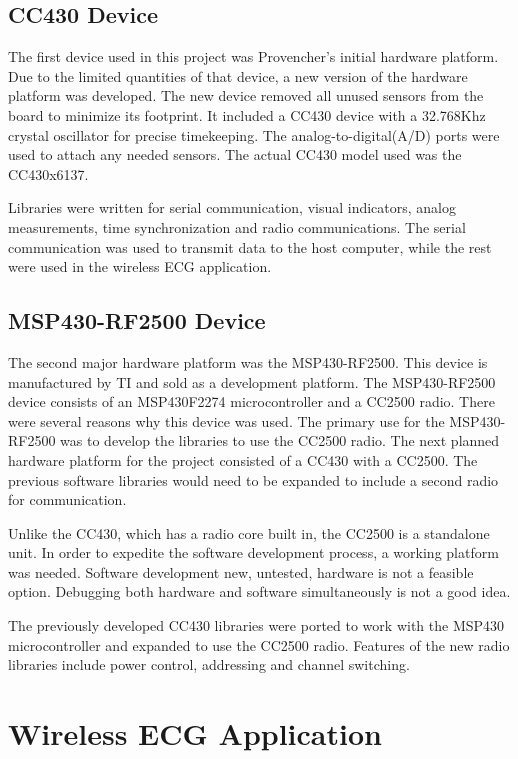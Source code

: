 \documentclass{article}
\begin{document}
\subsection{CC430 Device}
The first device used in this project was Provencher's initial hardware platform. Due to the limited quantities of that device, a new version of the hardware platform was developed. The new device removed all unused sensors from the board to minimize its footprint. It included a CC430 device with a 32.768Khz crystal oscillator for precise timekeeping. The analog-to-digital(A/D) ports were used to attach any needed sensors. The actual CC430 model used was the CC430x6137.

Libraries were written for serial communication, visual indicators, analog measurements, time synchronization and radio communications. The serial communication was used to transmit data to the host computer, while the rest were used in the wireless ECG application.

\subsection{MSP430-RF2500 Device}
The second major hardware platform was the MSP430-RF2500. This device is manufactured by TI and sold as a development platform. The MSP430-RF2500 device consists of an MSP430F2274 microcontroller and a CC2500 radio. There were several reasons why this device was used. The primary use for the MSP430-RF2500 was to develop the libraries to use the CC2500 radio. The next planned hardware platform for the project consisted of a CC430 with a CC2500. The previous software libraries would need to be expanded to include a second radio for communication.

Unlike the CC430, which has a radio core built in, the CC2500 is a standalone unit. In order to expedite the software development process, a working platform was needed. Software development new, untested, hardware is not a feasible option. Debugging both hardware and software simultaneously is not a good idea.

The previously developed CC430 libraries were ported to work with the MSP430 microcontroller and expanded to use the CC2500 radio. Features of the new radio libraries include power control, addressing and channel switching.

\section{Wireless ECG Application}\label{section:wirelessecg}
\end{document}
